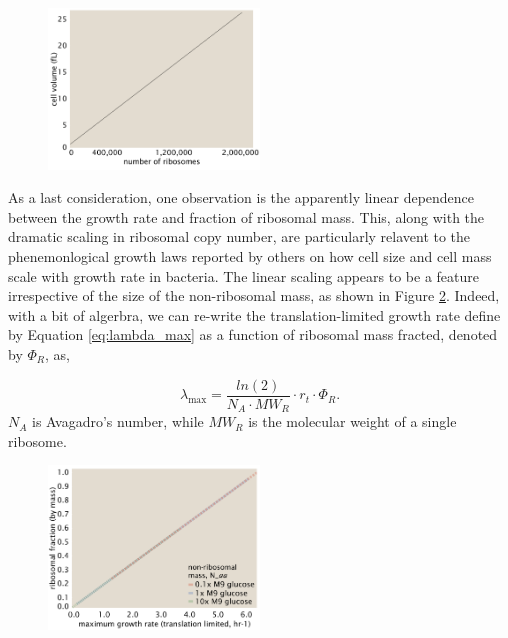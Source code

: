 \documentclass[11pt, letterpaper]{article}
\begin{document}
\begin{figure}[H]
		\centering
    \includegraphics[width=0.5\textwidth]{../../code/figures/SI/estimates_translation_volume.pdf}
  \caption{}
  \label{fig:estimates_translation_volume}
\end{figure}

As a last consideration, one observation is the apparently linear dependence
between the growth rate and fraction of ribosomal mass. This, along with the
dramatic scaling in ribosomal copy number, are particularly relavent to the
phenemonlogical growth laws reported by others on how cell size and cell mass
scale with growth rate in bacteria. The linear scaling appears to be a feature
irrespective of the size of the non-ribosomal mass, as shown in Figure
\ref{fig:estimates_translation_ribo_frac}. Indeed, with a bit of algerbra, we
can re-write the translation-limited growth rate define by Equation \ref{eq:lambda_max}
as a function of ribosomal mass fracted, denoted by $\Phi_R$, as,

\begin{equation}
\lambda_{\text{max}} =  \frac{ln(2)} {N_A \cdot MW_R} \cdot r_t \cdot \Phi_R.
\end{equation}
$N_A$ is Avagadro's number, while $MW_R$ is the molecular weight of a single ribosome.

\begin{figure}[H]
		\centering
    \includegraphics[width=0.5\textwidth]{../../code/figures/SI/estimates_translation_ribo_frac.pdf}
  \caption{}
  \label{fig:estimates_translation_ribo_frac}
\end{figure}
\end{document}
